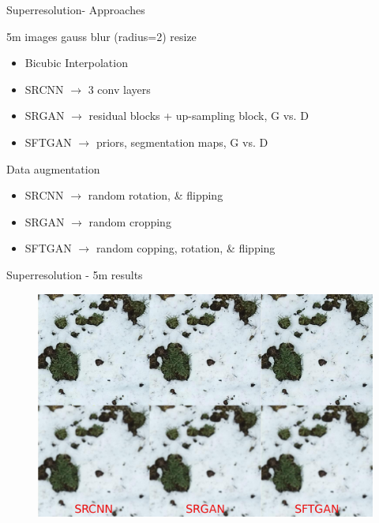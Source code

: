 \documentclass[aspectratio=43]{beamer}
\begin{document}
\begin{frame}{Superresolution- Approaches}
	\bigskip\bigskip
	\begin{block}{5m images \rightarrow  gauss blur (radius=2) \rightarrow resize}
	\begin{itemize}
		\item Bicubic Interpolation
		\item SRCNN $\rightarrow$ 3 conv layers
		\item SRGAN $\rightarrow$ residual blocks + up-sampling block, G vs. D
		\item SFTGAN $\rightarrow$ priors, segmentation maps, G vs. D
	\end{itemize}
	\end{block}
	
	\begin{exampleblock}{Data augmentation}
	\begin{itemize}
		\item SRCNN $\rightarrow$ random rotation, \& flipping
		\item SRGAN $\rightarrow$ random cropping
		\item SFTGAN $\rightarrow$ random copping, rotation, \& flipping
	\end{itemize}
	\end{exampleblock}	

\end{frame}


\begin{frame}{Superresolution - 5m results}
	\centering
	\bigskip\bigskip
	\begin{figure}	
		\includegraphics[width=\textwidth]{img/sr-result-5m.png}
	\end{figure}
\end{frame}
\end{document}
